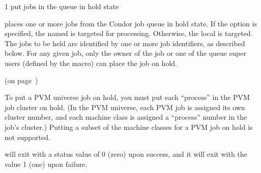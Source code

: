 \begin{ManPage}{\label{man-condor-hold}}{1}
{put jobs in the queue in hold state}
\Synopsis {}
\ToolArgs
{}


\Description

 places one or more jobs from the Condor job queue in hold state.
If the  option is specified, the named  is targeted
for processing.  
Otherwise, the local  is targeted.
The jobs to be held are identified by one or more job identifiers, as
described below.
For any given job, only the owner of the job or one of the queue super users
(defined by the  macro) can place the job on hold.

\begin{Options}

	\ToolArgsDesc

\end{Options}

\SeeAlso
{} (on page~\pageref{man-condor-release})

\GenRem

To put a PVM universe job on hold, you must put each ``process'' in
the PVM job cluster on hold.  (In the PVM universe, each PVM job is
assigned its own cluster number, and each machine class is assigned a
``process'' number in the job's cluster.)  Putting a subset of the
machine classes for a PVM job on hold is not supported.

\ExitStatus

 will exit with a status value of 0 (zero) upon success,
and it will exit with the value 1 (one) upon failure.

\end{ManPage}
